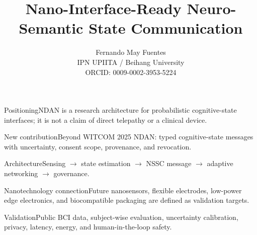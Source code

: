 \documentclass{beamer}
\title{Nano-Interface-Ready Neuro-Semantic State Communication}
\author{Fernando May Fuentes\\IPN UPIITA / Beihang University\\ORCID: 0009-0002-3953-5224}
\institute{NanoX 2026}
\begin{document}
\frame{\titlepage}
\begin{frame}{Positioning}NDAN is a research architecture for probabilistic cognitive-state interfaces; it is not a claim of direct telepathy or a clinical device.\end{frame}
\begin{frame}{New contribution}Beyond WITCOM 2025 NDAN: typed cognitive-state messages with uncertainty, consent scope, provenance, and revocation.\end{frame}
\begin{frame}{Architecture}Sensing $\rightarrow$ state estimation $\rightarrow$ NSSC message $\rightarrow$ adaptive networking $\rightarrow$ governance.\end{frame}
\begin{frame}{Nanotechnology connection}Future nanosensors, flexible electrodes, low-power edge electronics, and biocompatible packaging are defined as validation targets.\end{frame}
\begin{frame}{Validation}Public BCI data, subject-wise evaluation, uncertainty calibration, privacy, latency, energy, and human-in-the-loop safety.\end{frame}
\end{document}

